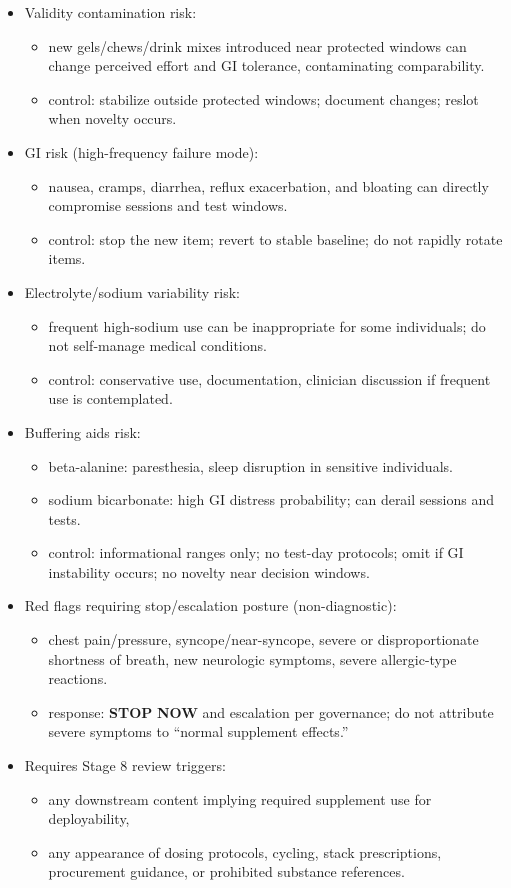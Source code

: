 \documentclass[10pt]{article}
\begin{document}
\begin{itemize}
\item Validity contamination risk:
  \begin{itemize}
  \item new gels/chews/drink mixes introduced near protected windows can change perceived effort and GI tolerance, contaminating comparability.
  \item control: stabilize outside protected windows; document changes; reslot when novelty occurs.
  \end{itemize}
\item GI risk (high-frequency failure mode):
  \begin{itemize}
  \item nausea, cramps, diarrhea, reflux exacerbation, and bloating can directly compromise sessions and test windows.
  \item control: stop the new item; revert to stable baseline; do not rapidly rotate items.
  \end{itemize}
\item Electrolyte/sodium variability risk:
  \begin{itemize}
  \item frequent high-sodium use can be inappropriate for some individuals; do not self-manage medical conditions.
  \item control: conservative use, documentation, clinician discussion if frequent use is contemplated.
  \end{itemize}
\item Buffering aids risk:
  \begin{itemize}
  \item beta-alanine: paresthesia, sleep disruption in sensitive individuals.
  \item sodium bicarbonate: high GI distress probability; can derail sessions and tests.
  \item control: informational ranges only; no test-day protocols; omit if GI instability occurs; no novelty near decision windows.
  \end{itemize}
\item Red flags requiring stop/escalation posture (non-diagnostic):
  \begin{itemize}
  \item chest pain/pressure, syncope/near-syncope, severe or disproportionate shortness of breath, new neurologic symptoms, severe allergic-type reactions.
  \item response: \textbf{STOP} \textbf{NOW} and escalation per governance; do not attribute severe symptoms to “normal supplement effects.”
  \end{itemize}
\item Requires Stage 8 review triggers:
  \begin{itemize}
  \item any downstream content implying required supplement use for deployability,
  \item any appearance of dosing protocols, cycling, stack prescriptions, procurement guidance, or prohibited substance references.
  \end{itemize}
\end{itemize}
\end{document}
